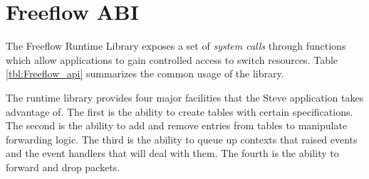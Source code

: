 
\section{Freeflow ABI} \label{fp:dp_interface}

The Freeflow Runtime Library exposes a set of \emph{system calls} through functions which allow applications to gain controlled access to switch resources. Table \ref{tbl:Freeflow_api} summarizes the common usage of the library.

The runtime library provides four major facilities that the Steve application takes advantage of. The first is the ability to create tables with certain specifications. The second is the ability to add and remove entries from tables to manipulate forwarding logic. The third is the ability to queue up contexts that raised events and the event handlers that will deal with them. The fourth is the ability to forward and drop packets.

